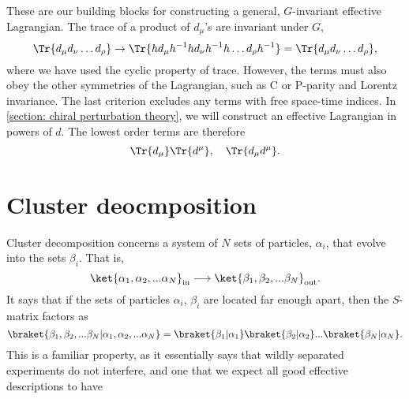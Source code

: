 \documentclass{book}
\begin{document}
These are our building blocks for constructing a general, $G$-invariant effective Lagrangian.
The trace of a product of $d_\mu$'s are invariant under $G$,
%
\begin{equation}
    \Tr{d_\mu d_\nu \dots d_\rho} 
    \rightarrow
    \Tr{h d_\mu h^{-1} h d_\nu h^{-1} h \dots d_\rho h^{-1}}
    = \Tr{d_\mu d_\nu \dots d_\rho},
\end{equation}
%
where we have used the cyclic property of trace.
However, the terms must also obey the other symmetries of the Lagrangian, such as C or P-parity and Lorentz invariance.
The last criterion excludes any terms with free space-time indices.
In \autoref{section: chiral perturbation theory}, we will construct an effective Lagrangian in powers of $d$.
The lowest order terms are therefore
%
\begin{equation}
    \label{first order terms CCWZ}
    \Tr{d_\mu} \Tr{d^\mu}, 
    \quad 
    \Tr{d_\mu d^\mu}.
\end{equation}
%


\section{Cluster deocmposition}

Cluster decomposition concerns a system of $N$ sets of particles, $\alpha_i$, that evolve into the sets $\beta_i$.
That is,
\begin{equation}
    \ket{\alpha_1, \alpha_2, ... \alpha_N}_\text{in}
    \longrightarrow
    \ket{\beta_1, \beta_2, ... \beta_N}_\text{out}.
\end{equation}
It says that if the sets of particles $\alpha_i$, $\beta_i$ are located far enough apart, then the $S$-matrix factors as
\begin{equation}
    {\braket{\beta_1, \beta_2, ... \beta_N|\alpha_1, \alpha_2, ... \alpha_N}}
    =
    \braket{\beta_1|\alpha_1}\braket{\beta_2|\alpha_2}... \braket{\beta_N|\alpha_N}.
\end{equation}
This is a familiar property, as it essentially says that wildly separated experiments do not interfere, and one that we expect all good effective descriptions to have
\end{document}
